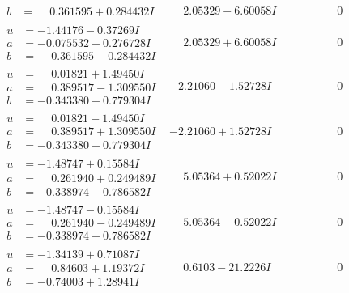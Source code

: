 \documentclass[1p]{elsarticle_modified}
\theoremstyle{definition}
\begin{document}
$$\begin{array}{c|c|c}
\begin{aligned}
b &= \phantom{-}0.361595 + 0.284432 I\end{aligned}
 & \phantom{-}2.05329 - 6.60058 I & \phantom{-0.000000 } 0 \\ \hline\begin{aligned}
u &= -1.44176 - 0.37269 I \\
a &= -0.075532 - 0.276728 I \\
b &= \phantom{-}0.361595 - 0.284432 I\end{aligned}
 & \phantom{-}2.05329 + 6.60058 I & \phantom{-0.000000 } 0 \\ \hline\begin{aligned}
u &= \phantom{-}0.01821 + 1.49450 I \\
a &= \phantom{-}0.389517 - 1.309550 I \\
b &= -0.343380 - 0.779304 I\end{aligned}
 & -2.21060 - 1.52728 I & \phantom{-0.000000 } 0 \\ \hline\begin{aligned}
u &= \phantom{-}0.01821 - 1.49450 I \\
a &= \phantom{-}0.389517 + 1.309550 I \\
b &= -0.343380 + 0.779304 I\end{aligned}
 & -2.21060 + 1.52728 I & \phantom{-0.000000 } 0 \\ \hline\begin{aligned}
u &= -1.48747 + 0.15584 I \\
a &= \phantom{-}0.261940 + 0.249489 I \\
b &= -0.338974 - 0.786582 I\end{aligned}
 & \phantom{-}5.05364 + 0.52022 I & \phantom{-0.000000 } 0 \\ \hline\begin{aligned}
u &= -1.48747 - 0.15584 I \\
a &= \phantom{-}0.261940 - 0.249489 I \\
b &= -0.338974 + 0.786582 I\end{aligned}
 & \phantom{-}5.05364 - 0.52022 I & \phantom{-0.000000 } 0 \\ \hline\begin{aligned}
u &= -1.34139 + 0.71087 I \\
a &= \phantom{-}0.84603 + 1.19372 I \\
b &= -0.74003 + 1.28941 I\end{aligned}
 & \phantom{-}0.6103 - 21.2226 I & \phantom{-0.000000 } 0 \\ \hline\begin{aligned}

\end{aligned}
\end{array}$$
\end{document}
